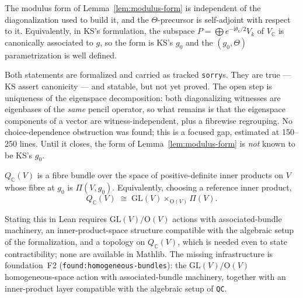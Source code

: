 \begin{lemma}
  \label{lem:modulus-canonicity}
  \notready
  The modulus form of Lemma~\ref{lem:modulus-form} is independent of the diagonalization
  used to build it, and the $\Theta$-precursor is self-adjoint with respect to it.
  Equivalently, in KS's formulation, the subspace
  $P = \bigoplus e^{-\mathrm i \theta_k/2} V_k$ of $V_{\mathbb C}$ is canonically
  associated to $g$, so the form is KS's $g_0$ and the $(g_0,\Theta)$ parametrization is
  well defined.

  Both statements are formalized and carried as tracked \texttt{sorry}s. They are true ---
  KS assert canonicity --- and statable, but not yet proved. The open step is uniqueness
  of the eigenspace decomposition: both diagonalizing witnesses are eigenbases of the
  \emph{same} pencil operator, so what remains is that the eigenspace components of a
  vector are witness-independent, plus a fibrewise regrouping. No choice-dependence
  obstruction was found; this is a focused gap, estimated at 150--250 lines. Until it
  closes, the form of Lemma~\ref{lem:modulus-form} is \emph{not} known to be KS's $g_0$.
\end{lemma}

\begin{proposition}
  \label{prop:parametrization}
  \notready
  $Q_{\mathbb C}(V)$ is a fibre bundle over the space of positive-definite
  inner products on $V$ whose fibre at $g_0$ is $\Pi(V, g_0)$. Equivalently,
  choosing a reference inner product,
  \[
    Q_{\mathbb C}(V) \;\cong\; \mathrm{GL}(V) \times_{\mathrm{O}(V)} \Pi(V).
  \]

  Stating this in Lean requires $\mathrm{GL}(V)/\mathrm{O}(V)$ actions with
  associated-bundle machinery, an inner-product-space structure compatible
  with the algebraic setup of the formalization, and a topology on
  $Q_{\mathbb C}(V)$, which is needed even to state contractibility; none
  are available in Mathlib. The missing infrastructure is foundation~F2
  (\texttt{found:homogeneous-bundles}): the $\mathrm{GL}(V)/\mathrm{O}(V)$
  homogeneous-space action with associated-bundle machinery, together with
  an inner-product layer compatible with the algebraic setup of
  \texttt{QC}.
\end{proposition}

